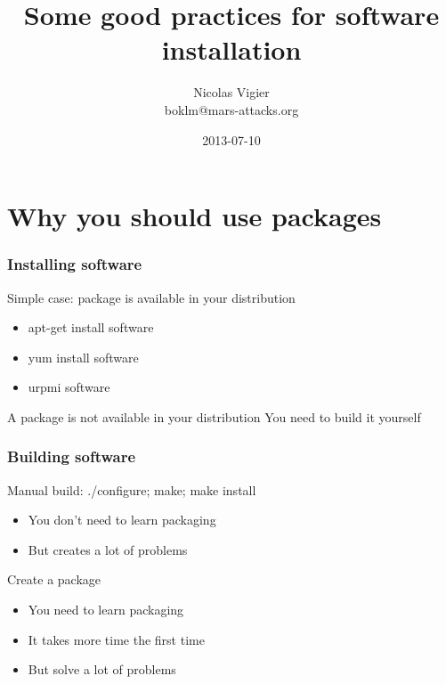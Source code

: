 \documentclass{beamer}
\begin{document}
\title{Some good practices for software installation}
\author[Nicolas Vigier]{Nicolas Vigier\\\small{boklm@mars-attacks.org}}
\date{2013-07-10}

\frame{\titlepage}

\frame{\tableofcontents}

\section{Why you should use packages}

\begin{frame}
  \frametitle{Installing software}
  \begin{block}{Simple case: package is available in your distribution}
    \begin{itemize}
      \item apt-get install software
      \item yum install software
      \item urpmi software
    \end{itemize}
  \end{block}

  \begin{block}{A package is not available in your distribution}
    You need to build it yourself
  \end{block}
\end{frame}

\begin{frame}
  \frametitle{Building software}

  \begin{block}{Manual build: ./configure; make; make install}
    \begin{itemize}
      \item You don't need to learn packaging
      \item But creates a lot of problems
    \end{itemize}
  \end{block}

  \begin{block}{Create a package}
    \begin{itemize}
      \item You need to learn packaging
      \item It takes more time the first time
      \item But solve a lot of problems
    \end{itemize}
  \end{block}
\end{frame}
\end{document}
